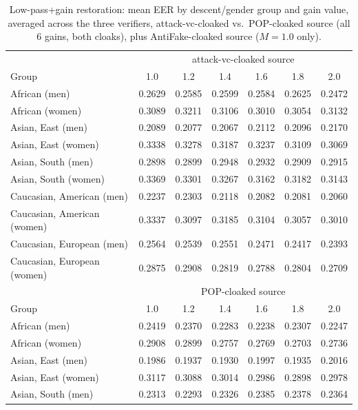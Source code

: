 \documentclass[11pt]{article}
\begin{document}
\begin{table}[H]
\centering
\caption{Low-pass+gain restoration: mean EER by descent/gender group
and gain value, averaged across the three verifiers, attack-vc-cloaked
vs.\ POP-cloaked source (all 6 gains, both cloaks), plus AntiFake-cloaked
source ($M=1.0$ only).}
\label{tab:restoration-lowpass-demographics}
\begin{tabular}{lcccccc}
\toprule
& \multicolumn{6}{c}{attack-vc-cloaked source} \\
Group & 1.0 & 1.2 & 1.4 & 1.6 & 1.8 & 2.0 \\
\midrule
African (men)               & 0.2629 & 0.2585 & 0.2599 & 0.2584 & 0.2625 & 0.2472 \\
African (women)             & 0.3089 & 0.3211 & 0.3106 & 0.3010 & 0.3054 & 0.3132 \\
Asian, East (men)           & 0.2089 & 0.2077 & 0.2067 & 0.2112 & 0.2096 & 0.2170 \\
Asian, East (women)         & 0.3338 & 0.3278 & 0.3187 & 0.3237 & 0.3109 & 0.3069 \\
Asian, South (men)          & 0.2898 & 0.2899 & 0.2948 & 0.2932 & 0.2909 & 0.2915 \\
Asian, South (women)        & 0.3369 & 0.3301 & 0.3267 & 0.3162 & 0.3182 & 0.3143 \\
Caucasian, American (men)   & 0.2237 & 0.2303 & 0.2118 & 0.2082 & 0.2081 & 0.2060 \\
Caucasian, American (women) & 0.3337 & 0.3097 & 0.3185 & 0.3104 & 0.3057 & 0.3010 \\
Caucasian, European (men)   & 0.2564 & 0.2539 & 0.2551 & 0.2471 & 0.2417 & 0.2393 \\
Caucasian, European (women) & 0.2875 & 0.2908 & 0.2819 & 0.2788 & 0.2804 & 0.2709 \\
\midrule
& \multicolumn{6}{c}{POP-cloaked source} \\
Group & 1.0 & 1.2 & 1.4 & 1.6 & 1.8 & 2.0 \\
\midrule
African (men)               & 0.2419 & 0.2370 & 0.2283 & 0.2238 & 0.2307 & 0.2247 \\
African (women)              & 0.2908 & 0.2899 & 0.2757 & 0.2769 & 0.2703 & 0.2736 \\
Asian, East (men)            & 0.1986 & 0.1937 & 0.1930 & 0.1997 & 0.1935 & 0.2016 \\
Asian, East (women)          & 0.3117 & 0.3088 & 0.3014 & 0.2986 & 0.2898 & 0.2978 \\
Asian, South (men)           & 0.2313 & 0.2293 & 0.2326 & 0.2385 & 0.2378 & 0.2364 \\

\end{tabular}
\end{table}
\end{document}
